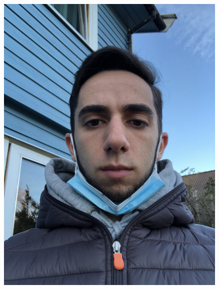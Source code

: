 \begin{figure}[h]
\centering
    \subfloat
        {\includegraphics[scale = 0.13]{figures/926.png}\hspace{0.4cm}}
    \subfloat

\end{figure}
